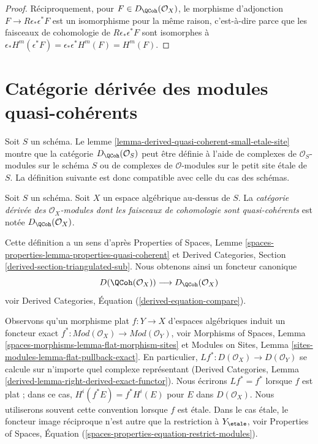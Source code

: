 \begin{proof}
\medskip\noindent
Réciproquement, pour $F \in D_\QCoh(\mathcal{O}_X)$, le
morphisme d'adjonction $F \to R\epsilon_*\epsilon^*F$
est un isomorphisme pour la même raison, c'est-à-dire parce que
les faisceaux de cohomologie de $R\epsilon_*\epsilon^*F$
sont isomorphes à
$\epsilon_*H^m(\epsilon^*F) = \epsilon_*\epsilon^*H^m(F) = H^m(F)$.
\end{proof}










\section{Catégorie dérivée des modules quasi-cohérents}
\label{section-derived-quasi-coherent}

\noindent
Soit $S$ un schéma. Le lemme
\ref{lemma-derived-quasi-coherent-small-etale-site}
montre que la catégorie $D_\QCoh(\mathcal{O}_S)$ peut être définie
à l'aide de complexes de $\mathcal{O}_S$-modules sur le schéma $S$
ou de complexes de $\mathcal{O}$-modules sur le petit site étale
de $S$. La définition suivante est donc compatible avec celle
du cas des schémas.

\begin{definition}
\label{definition-derived-quasi-coherent}
Soit $S$ un schéma. Soit $X$ un espace algébrique au-dessus de $S$.
La {\it catégorie dérivée des $\mathcal{O}_X$-modules dont les
faisceaux de cohomologie sont quasi-cohérents} est notée
$D_\QCoh(\mathcal{O}_X)$.
\end{definition}

\noindent
Cette définition a un sens d'après
Properties of Spaces, Lemme
\ref{spaces-properties-lemma-properties-quasi-coherent}
et
Derived Categories, Section \ref{derived-section-triangulated-sub}.
Nous obtenons ainsi un foncteur canonique
\begin{equation}
\label{equation-compare}
D(\QCoh(\mathcal{O}_X))
\longrightarrow
D_\QCoh(\mathcal{O}_X)
\end{equation}
voir Derived Categories, Équation (\ref{derived-equation-compare}).

\medskip\noindent
Observons qu'un morphisme plat $f : Y \to X$ d'espaces algébriques
induit un foncteur exact
$f^* : \textit{Mod}(\mathcal{O}_X) \to \textit{Mod}(\mathcal{O}_Y)$,
voir
Morphisms of Spaces, Lemma \ref{spaces-morphisms-lemma-flat-morphism-sites}
et
Modules on Sites, Lemma \ref{sites-modules-lemma-flat-pullback-exact}.
En particulier, $Lf^* : D(\mathcal{O}_X) \to D(\mathcal{O}_Y)$
se calcule sur n'importe quel complexe représentant
(Derived Categories, Lemma \ref{derived-lemma-right-derived-exact-functor}).
Nous écrirons $Lf^* = f^*$ lorsque $f$ est plat ; dans ce cas,
$H^i(f^*E) = f^*H^i(E)$ pour $E$ dans $D(\mathcal{O}_X)$.
Nous utiliserons souvent cette convention lorsque $f$ est étale. Dans le cas étale,
le foncteur image réciproque n'est autre que la restriction à $Y_\etale$,
voir Properties of Spaces, Équation
(\ref{spaces-properties-equation-restrict-modules}).

